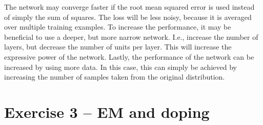 \documentclass[a4paper]{article}
\begin{document}
\begin{enumerate}
The network may converge faster if the root mean squared error is used instead of simply the sum of squares. The loss will be less noisy, because it is averaged over multiple training examples. To increase the performance, it may be beneficial to use a deeper, but more narrow network. I.e., increase the number of layers, but decrease the number of units per layer. This will increase the expressive power of the network. Lastly, the performance of the network can be increased by using more data. In this case, this can simply be achieved by increasing the number of samples taken from the original distribution.
\end{enumerate}


\pagebreak
\section*{Exercise 3 -- EM and doping} %
\end{document}
